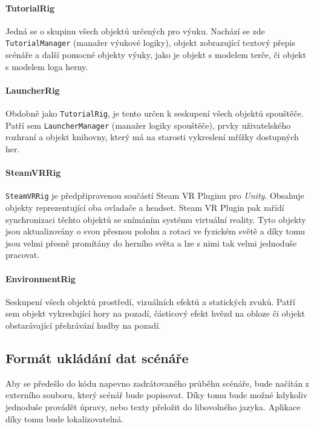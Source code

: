 \paragraph{TutorialRig}\label{tutorialrig}

Jedná se o skupinu všech objektů určených pro výuku. Nachází se zde
\texttt{TutorialManager} (manažer výukové logiky), objekt zobrazující textový přepis scénáře a
další pomocné objekty výuky, jako je objekt s modelem terče, či objekt s
modelem loga herny.

\paragraph{LauncherRig}\label{launcherrig}

Obdobně jako \texttt{TutorialRig}, je tento určen k seskupení všech
objektů spouštěče. Patří sem \texttt{LauncherManager} (manažer logiky spouštěče), prvky
uživatelského rozhraní a objekt knihovny, který má na starosti
vykreslení mřížky dostupných her.

\paragraph{SteamVRRig}\label{steamvrrig}

\texttt{SteamVRRig} je předpřipravenou součástí Steam VR Pluginu pro
\emph{Unity}. Obsahuje objekty reprezentující oba ovladače a headset.
Steam VR Plugin pak zařídí synchronizaci těchto objektů se snímáním
systému virtuální reality. Tyto objekty jsou aktualizovány o svou
přesnou polohu a rotaci ve fyzickém světě a díky tomu jsou velmi přesně
promítány do herního světa a lze s nimi tak velmi jednoduše pracovat.

\paragraph{EnvironmentRig}\label{environmentrig}

Seskupení všech objektů prostředí, vizuálních efektů a
statických zvuků. Patří sem objekt vykreslující hory na pozadí,
částicový efekt hvězd na obloze či objekt obstarávající přehrávání hudby
na pozadí.

\subsection{Formát ukládání dat
scénáře}\label{formuxe1t-ukluxe1duxe1nuxed-dat-scuxe9nuxe1ux159e}

Aby se předešlo do kódu napevno zadrátovaného průběhu scénáře, bude
načítán z externího souboru, který scénář bude popisovat. Díky tomu bude
možné kdykoliv jednoduše provádět úpravy, nebo texty přeložit do
libovolného jazyka. Aplikace díky tomu bude lokalizovatelná.

